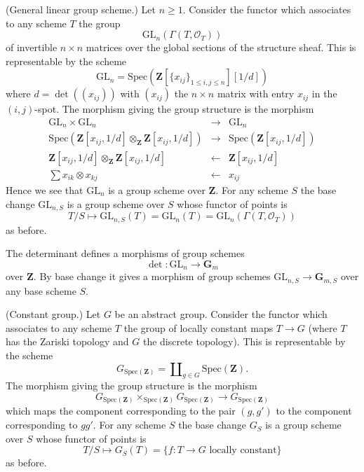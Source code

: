 \begin{example}
\label{example-general-linear-group}
(General linear group scheme.)
Let $n \geq 1$.
Consider the functor which associates
to any scheme $T$ the group
$$
\text{GL}_n(\Gamma(T, \mathcal{O}_T))
$$
of invertible $n \times n$ matrices over
the global sections of the structure sheaf.
This is representable by the scheme
$$
\text{GL}_n = \text{Spec}(\mathbf{Z}[\{x_{ij}\}_{1 \leq i, j \leq n}][1/d])
$$
where $d = \det((x_{ij}))$ with $(x_{ij})$ the $n \times n$ matrix
with entry $x_{ij}$ in the $(i, j)$-spot.
The morphism giving the group structure is the morphism
\begin{eqnarray*}
\text{GL}_n \times \text{GL}_n & \to & \text{GL}_n \\
\text{Spec}(\mathbf{Z}[x_{ij}, 1/d] \otimes_{\mathbf{Z}}
\mathbf{Z}[x_{ij}, 1/d])
& \to &
\text{Spec}(\mathbf{Z}[x_{ij}, 1/d]) \\
\mathbf{Z}[x_{ij}, 1/d] \otimes_{\mathbf{Z}} \mathbf{Z}[x_{ij}, 1/d]
& \leftarrow &
\mathbf{Z}[x_{ij}, 1/d] \\
\sum x_{ik} \otimes x_{kj} & \leftarrow & x_{ij}
\end{eqnarray*}
Hence we see that $\text{GL}_n$ is a group scheme over $\mathbf{Z}$.
For any scheme $S$ the base change $\text{GL}_{n, S}$ is a
group scheme over $S$ whose functor of points is
$$
T/S
\longmapsto
\text{GL}_{n, S}(T) = \text{GL}_n(T) =\text{GL}_n(\Gamma(T, \mathcal{O}_T))
$$
as before.
\end{example}

\begin{example}
\label{example-determinant}
The determinant defines a morphisms of group schemes
$$
\det : \text{GL}_n \longrightarrow \mathbf{G}_m
$$
over $\mathbf{Z}$. By base change it gives a morphism
of group schemes $\text{GL}_{n, S} \to \mathbf{G}_{m, S}$
over any base scheme $S$.
\end{example}

\begin{example}
\label{example-constant-group}
(Constant group.)
Let $G$ be an abstract group. Consider the functor
which associates to any scheme $T$ the group
of locally constant maps $T \to G$ (where $T$ has the Zariski topology
and $G$ the discrete topology). This is representable by the scheme
$$
G_{\text{Spec}(\mathbf{Z})} =
\coprod\nolimits_{g \in G} \text{Spec}(\mathbf{Z}).
$$
The morphism giving the group structure is the morphism
$$
G_{\text{Spec}(\mathbf{Z})}
\times_{\text{Spec}(\mathbf{Z})}
G_{\text{Spec}(\mathbf{Z})}
\longrightarrow
G_{\text{Spec}(\mathbf{Z})}
$$
which maps the component corresponding to the pair $(g, g')$ to the
component corresponding to $gg'$. For any scheme $S$ the base change
$G_S$ is a group scheme over $S$ whose functor of points is
$$
T/S
\longmapsto
G_S(T) = \{f : T \to G \text{ locally constant}\}
$$
as before.
\end{example}






